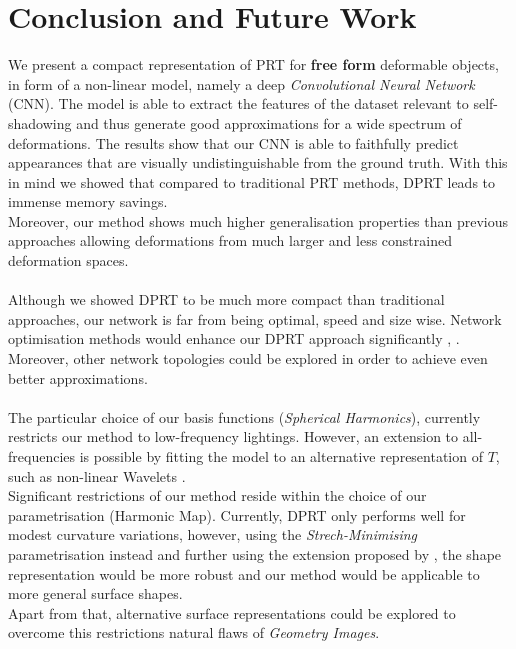 \section{Conclusion and Future Work}
We present a compact representation of PRT for \textbf{free form} deformable objects, in form of a non-linear model, namely a deep \textit{Convolutional Neural Network} (CNN).  The model is able to extract the features of the dataset relevant to self-shadowing and thus generate good approximations for a wide spectrum of deformations. The results show that our CNN is able to faithfully predict appearances that are visually undistinguishable from the ground truth.  With this in mind we showed that compared to traditional PRT methods, DPRT leads to immense memory savings.
\\ 
Moreover, our method shows much higher generalisation properties than previous approaches allowing deformations from much larger and less constrained deformation spaces.\\
\\
Although we showed DPRT to be much more compact than traditional approaches, our network is far from being optimal, speed and size wise. Network optimisation methods would enhance our DPRT approach significantly \cite{Survey_NN_Compression}, \cite{Deep_Compression}.
Moreover, other network topologies could be explored in order to achieve even better approximations.\\
\\
The particular choice of our basis functions (\textit{Spherical Harmonics}), currently restricts our method to low-frequency lightings. However, an extension to all-frequencies is possible by fitting the model to an alternative representation of $T$, such as non-linear Wavelets \cite{AllFrequencyPRT}.
\\
Significant restrictions of our method reside within the choice of our parametrisation (Harmonic Map).  Currently, DPRT only performs well for modest curvature variations, however, using the \textit{Strech-Minimising} parametrisation instead and further using the extension proposed by \cite{Spherical_Parametrization}, the shape representation would be more robust and our method would be applicable to more general surface shapes. \\
Apart from that, alternative surface representations could be explored to overcome this restrictions natural flaws of \textit{Geometry Images}. 

